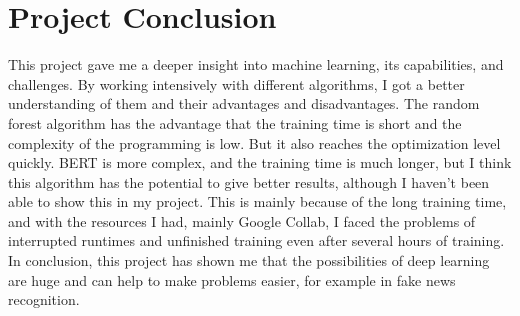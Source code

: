 \documentclass{article}
\begin{document}
\section*{Project Conclusion}
This project gave me a deeper insight into machine learning, its capabilities, and challenges. By working intensively with different algorithms, I got a better understanding of them and their advantages and disadvantages. The random forest algorithm has the advantage that the training time is short and the complexity of the programming is low. But it also reaches the optimization level quickly. BERT is more complex, and the training time is much longer, but I think this algorithm has the potential to give better results, although I haven't been able to show this in my project. This is mainly because of the long training time, and with the resources I had, mainly Google Collab, I faced the problems of interrupted runtimes and unfinished training even after several hours of training. In conclusion, this project has shown me that the possibilities of deep learning are huge and can help to make problems easier, for example in fake news recognition.
\end{document}
